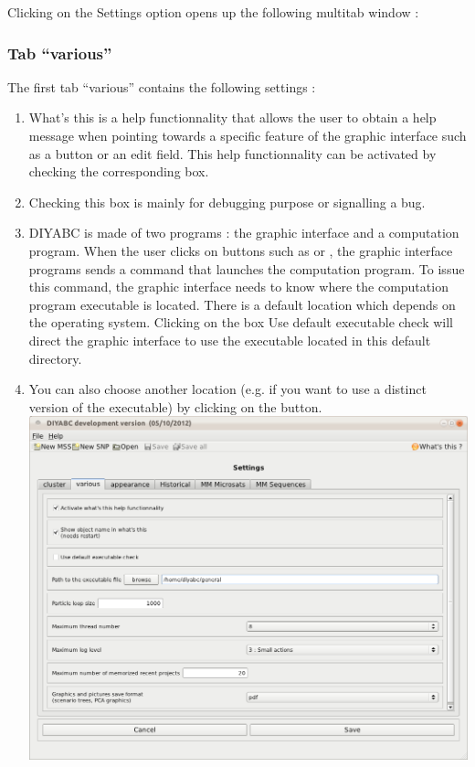 \newpage{}

Clicking on the \textsf{Settings} option opens up the following multitab
window :\\



\subsubsection{Tab \textsf{``various''}}

The first tab \textsf{``various''} contains the following settings
:
\begin{enumerate}
\item \textsf{What's this} is a help functionnality that allows the user
to obtain a help message when pointing towards a specific feature
of the graphic interface such as a button or an edit field. This help
functionnality can be activated by checking the corresponding box.
\item Checking this box is mainly for debugging purpose or signalling a
bug.
\item DIYABC is made of two programs : the graphic interface and a computation
program. When the user clicks on buttons such as  or , the graphic interface
programs sends a command that launches the computation program. To
issue this command, the graphic interface needs to know where the
computation program executable is located. There is a default location
which depends on the operating system. Clicking on the box \textsf{Use
default executable check} will direct the graphic interface to use
the executable located in this default directory.
\item You can also choose another location (e.g. if you want to use a distinct
version of the executable) by clicking on the 
button.\\
 \includegraphics[scale=0.33]{gui_pictures/Capture-DIYABC-94} \\


\end{enumerate}
